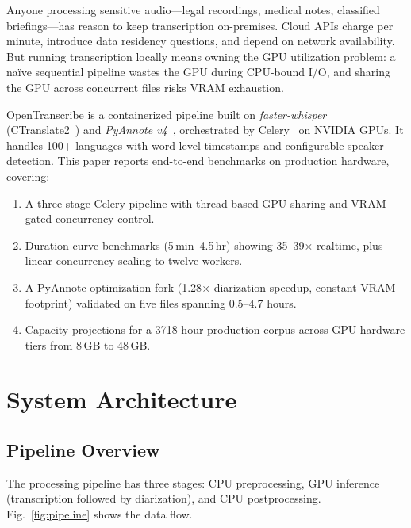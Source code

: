 \documentclass[conference,10pt]{IEEEtran}
\begin{document}
Anyone processing sensitive audio---legal recordings, medical notes, classified
briefings---has reason to keep transcription on-premises. Cloud APIs charge per
minute, introduce data residency questions, and depend on network availability.
But running transcription locally means owning the GPU utilization problem:
a na\"ive sequential pipeline wastes the GPU during CPU-bound I/O, and sharing
the GPU across concurrent files risks VRAM exhaustion.

OpenTranscribe is a containerized pipeline built on
\textit{faster-whisper}~\cite{fasterwhisper2023}
(CTranslate2~\cite{ctranslate2_2023}) and
\textit{PyAnnote v4}~\cite{bredin2023pyannote21}, orchestrated by
Celery~\cite{celery2024} on NVIDIA GPUs.
It handles 100+ languages with word-level timestamps and configurable speaker
detection. This paper reports end-to-end benchmarks on production hardware,
covering:
\begin{enumerate}[nosep,leftmargin=*]
  \item A three-stage Celery pipeline with thread-based GPU sharing and
        VRAM-gated concurrency control.
  \item Duration-curve benchmarks (5\,min--4.5\,hr) showing 35--39$\times$
        realtime, plus linear concurrency scaling to twelve workers.
  \item A PyAnnote optimization fork (1.28$\times$ diarization speedup,
        constant VRAM footprint) validated on five files spanning 0.5--4.7
        hours.
  \item Capacity projections for a \num{3718}-hour production corpus across
        GPU hardware tiers from 8\,GB to 48\,GB.
\end{enumerate}

\section{System Architecture}

\subsection{Pipeline Overview}

The processing pipeline has three stages: CPU preprocessing, GPU inference
(transcription followed by diarization), and CPU postprocessing.
Fig.~\ref{fig:pipeline} shows the data flow.
\end{document}

